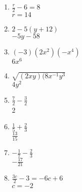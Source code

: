 \documentclass[12pt]{article}
\begin{document}
\begin{multicols}{2}
\begin{enumerate}
	\item \( \frac{r}{2} - 6 = 8 \) \\
		\( r = 14 \)

	\item \( 2 - 5(y + 12) \) \\
		\( -5y -58 \)

	\item \( (-3)(2x^{2})(-x^{4}) \) \\
		\( 6x^{6} \)

	\item \( \sqrt{(2xy)(8x^{-1}y^{3}} \) \\
		\( 4y^{2} \)

	\item \( \frac{7}{2} - \frac{3}{2} \) \\
		2

	\item \( \frac{1}{5} + \frac{2}{3} \) \\
		\( \frac{13}{15} \)

	\item \( -\frac{1}{7} - \frac{2}{3} \) \\
		\( -\frac{17}{21} \)

	\item \( \frac{3c}{2} - 3 = -6c + 6 \) \\
		\( c = -2 \)

\end{enumerate}
\end{multicols}
\end{document}
